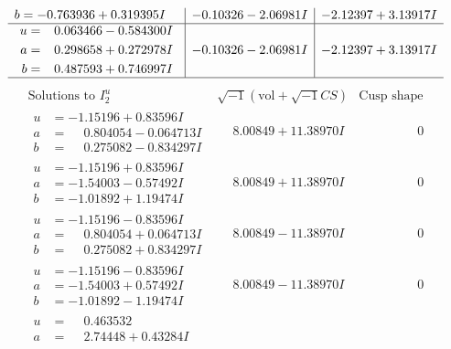 \documentclass[1p]{elsarticle_modified}
\theoremstyle{definition}
\newcommand{\I}{\sqrt{-1}}
\begin{document}
$$\begin{array}{c|c|c}
\begin{aligned}
b &= -0.763936 + 0.319395 I\end{aligned}
 & -0.10326 - 2.06981 I & -2.12397 + 3.13917 I \\ \hline\begin{aligned}
u &= \phantom{-}0.063466 - 0.584300 I \\
a &= \phantom{-}0.298658 + 0.272978 I \\
b &= \phantom{-}0.487593 + 0.746997 I\end{aligned}
 & -0.10326 - 2.06981 I & -2.12397 + 3.13917 I\\
 \hline 
 \end{array}$$\newpage$$\begin{array}{c|c|c}  
\text{Solutions to }I^u_{2}& \I (\text{vol} + \sqrt{-1}CS) & \text{Cusp shape}\\
 \hline 
\begin{aligned}
u &= -1.15196 + 0.83596 I \\
a &= \phantom{-}0.804054 - 0.064713 I \\
b &= \phantom{-}0.275082 - 0.834297 I\end{aligned}
 & \phantom{-}8.00849 + 11.38970 I & \phantom{-0.000000 } 0 \\ \hline\begin{aligned}
u &= -1.15196 + 0.83596 I \\
a &= -1.54003 - 0.57492 I \\
b &= -1.01892 + 1.19474 I\end{aligned}
 & \phantom{-}8.00849 + 11.38970 I & \phantom{-0.000000 } 0 \\ \hline\begin{aligned}
u &= -1.15196 - 0.83596 I \\
a &= \phantom{-}0.804054 + 0.064713 I \\
b &= \phantom{-}0.275082 + 0.834297 I\end{aligned}
 & \phantom{-}8.00849 - 11.38970 I & \phantom{-0.000000 } 0 \\ \hline\begin{aligned}
u &= -1.15196 - 0.83596 I \\
a &= -1.54003 + 0.57492 I \\
b &= -1.01892 - 1.19474 I\end{aligned}
 & \phantom{-}8.00849 - 11.38970 I & \phantom{-0.000000 } 0 \\ \hline\begin{aligned}
u &= \phantom{-}0.463532\phantom{ +0.000000I} \\
a &= \phantom{-}2.74448 + 0.43284 I \\

\end{aligned}
\end{array}$$
\end{document}
